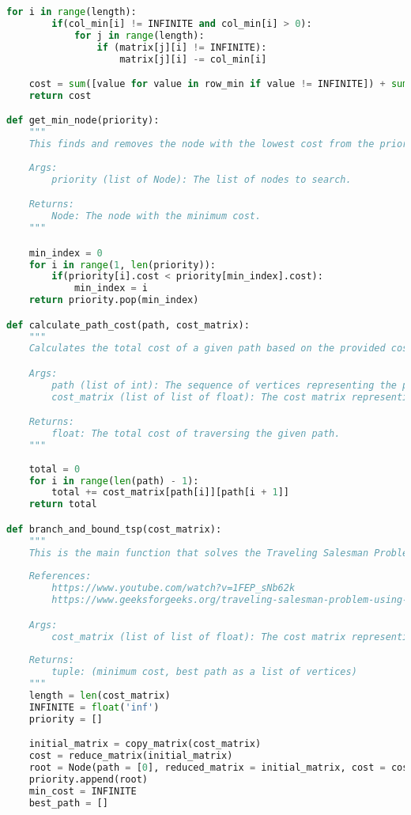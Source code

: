 \documentclass{article}
\begin{document}
\begin{lstlisting}[language=Python]
    for i in range(length):
        if(col_min[i] != INFINITE and col_min[i] > 0):
            for j in range(length):
                if (matrix[j][i] != INFINITE):
                    matrix[j][i] -= col_min[i]

    cost = sum([value for value in row_min if value != INFINITE]) + sum([value for value in col_min if value != INFINITE])
    return cost

def get_min_node(priority):
    """
    This finds and removes the node with the lowest cost from the priority list and this simulates a priority queue for the branch and bound algorithm.
    
    Args:
        priority (list of Node): The list of nodes to search.

    Returns:
        Node: The node with the minimum cost.
    """

    min_index = 0
    for i in range(1, len(priority)):
        if(priority[i].cost < priority[min_index].cost):
            min_index = i
    return priority.pop(min_index)

def calculate_path_cost(path, cost_matrix):
    """
    Calculates the total cost of a given path based on the provided cost matrix.

    Args:
        path (list of int): The sequence of vertices representing the path.
        cost_matrix (list of list of float): The cost matrix representing the graph.

    Returns:
        float: The total cost of traversing the given path.
    """
        
    total = 0
    for i in range(len(path) - 1):
        total += cost_matrix[path[i]][path[i + 1]]
    return total

def branch_and_bound_tsp(cost_matrix):
    """
    This is the main function that solves the Traveling Salesman Problem using the branch and bound method and returns the minimum cost and the best path found.
    
    References:
        https://www.youtube.com/watch?v=1FEP_sNb62k
        https://www.geeksforgeeks.org/traveling-salesman-problem-using-branch-and-bound-2/

    Args:
        cost_matrix (list of list of float): The cost matrix representing the graph
        
    Returns:
        tuple: (minimum cost, best path as a list of vertices)
    """
    length = len(cost_matrix)
    INFINITE = float('inf')
    priority = []

    initial_matrix = copy_matrix(cost_matrix)
    cost = reduce_matrix(initial_matrix)
    root = Node(path = [0], reduced_matrix = initial_matrix, cost = cost, vertex = 0, level = 0)
    priority.append(root)
    min_cost = INFINITE
    best_path = []


\end{lstlisting}
\end{document}
